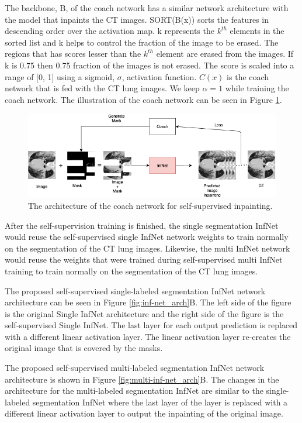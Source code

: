 The backbone, B, of the coach network has a similar network architecture with the model that inpaints the CT images. SORT(B(x)) sorts the features in descending order over the activation map. k represents the $k^{th}$ elements in the sorted list and k helps to control the fraction of the image to be erased. The regions that has scores lesser than the $k^{th}$ element are erased from the images. If k is 0.75 then 0.75 fraction of the images is not erased. The score is scaled into a range of [0, 1] using a sigmoid, $\sigma$, activation function. $C(x)$ is the coach network that is fed with the CT lung images. We keep $\alpha = 1$ while training the coach network.
The illustration of the coach network can be seen in Figure \ref{fig:coach-arch}.

\begin{figure}
	\centering
	\small
	\includegraphics[width=\linewidth]{coach.png}
	\caption{The architecture of the coach network for self-supervised inpainting. }
	\label{fig:coach-arch}
\end{figure}

After the self-supervision training is finished, the single segmentation InfNet would reuse the self-supervised single InfNet network weights to train normally on the segmentation of the CT lung images. Likewise, the multi InfNet network would reuse the weights that were trained during self-supervised multi InfNet training to train normally on the segmentation of the CT lung images.

The proposed self-supervised single-labeled segmentation InfNet network architecture can be seen in Figure \ref{fig:inf-net_arch}B. The left side of the figure is the original Single InfNet architecture and the right side of the figure is the self-supervised Single InfNet. The last layer for each output prediction is replaced with a different linear activation layer. The linear activation layer re-creates the original image that is covered by the masks. 


The proposed self-supervised multi-labeled segmentation InfNet network architecture is shown in Figure \ref{fig:multi-inf-net_arch}B. The changes in the architecture for the multi-labeled segmentation InfNet are similar to the single-labeled segmentation InfNet where the last layer of the layer is replaced with a different linear activation layer to output the inpainting of the original image. 



